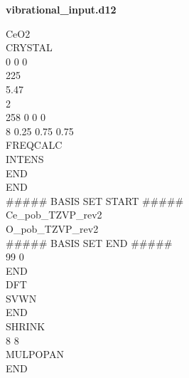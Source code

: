 \documentclass{article}
\begin{document}
\begin{minipage}[t]{0.45\textwidth}
    \textbf{vibrational\_input.d12}
    
    \vspace{15pt}
    
    CeO2
	\\CRYSTAL
	\\0 0 0 
	\\225
	\\5.47
	\\2
	\\258 0 0 0
	\\8 0.25 0.75 0.75
	\\FREQCALC
	\\INTENS
	\\END
	\\END
	\\\#\#\#\#\# BASIS SET START \#\#\#\#\#
	\\Ce\_pob\_TZVP\_rev2
	\\O\_pob\_TZVP\_rev2
	\\\#\#\#\#\# BASIS SET END \#\#\#\#\#
	\\99 0
	\\END
	\\DFT
	\\SVWN
	\\END
	\\SHRINK
	\\8 8
	\\MULPOPAN
	\\END
	
\end{minipage}
\hfill
\end{document}
